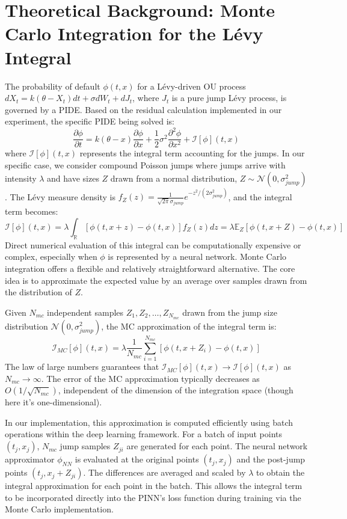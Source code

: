\documentclass[11pt,twoside,openright]{report}
\begin{document}
\section{Theoretical Background: Monte Carlo Integration for the Lévy Integral}
\label{sec:mc_background}

The probability of default $\phi(t, x)$ for a Lévy-driven OU process $dX_t = k(\theta - X_t)dt + \sigma dW_t + dJ_t$, where $J_t$ is a pure jump Lévy process, is governed by a PIDE. Based on the residual calculation implemented in our experiment, the specific PIDE being solved is:
$$
\frac{\partial \phi}{\partial t} = k(\theta - x)\frac{\partial \phi}{\partial x} + \frac{1}{2}\sigma^2 \frac{\partial^2 \phi}{\partial x^2} + \mathcal{I}[\phi](t, x)
$$
where $\mathcal{I}[\phi](t, x)$ represents the integral term accounting for the jumps. In our specific case, we consider compound Poisson jumps where jumps arrive with intensity $\lambda$ and have sizes $Z$ drawn from a normal distribution, $Z \sim \mathcal{N}(0, \sigma_{jump}^2)$. The Lévy measure density is $f_Z(z) = \frac{1}{\sqrt{2\pi}\sigma_{jump}} e^{-z^2/(2\sigma_{jump}^2)}$, and the integral term becomes:
$$
\mathcal{I}[\phi](t, x) = \lambda \int_{\mathbb{R}} [\phi(t, x+z) - \phi(t, x)] f_Z(z) dz = \lambda \mathbb{E}_Z[\phi(t, x+Z) - \phi(t, x)]
$$
Direct numerical evaluation of this integral can be computationally expensive or complex, especially when $\phi$ is represented by a neural network. Monte Carlo integration offers a flexible and relatively straightforward alternative. The core idea is to approximate the expected value by an average over samples drawn from the distribution of $Z$.

Given $N_{mc}$ independent samples $Z_1, Z_2, \dots, Z_{N_{mc}}$ drawn from the jump size distribution $\mathcal{N}(0, \sigma_{jump}^2)$, the MC approximation of the integral term is:
$$
\mathcal{I}_{MC}[\phi](t, x) = \lambda \frac{1}{N_{mc}} \sum_{i=1}^{N_{mc}} [\phi(t, x+Z_i) - \phi(t, x)]
$$
The law of large numbers guarantees that $\mathcal{I}_{MC}[\phi](t, x) \to \mathcal{I}[\phi](t, x)$ as $N_{mc} \to \infty$. The error of the MC approximation typically decreases as $O(1/\sqrt{N_{mc}})$, independent of the dimension of the integration space (though here it's one-dimensional).

In our implementation, this approximation is computed efficiently using batch operations within the deep learning framework. For a batch of input points $(t_j, x_j)$, $N_{mc}$ jump samples $Z_{ji}$ are generated for each point. The neural network approximator $\phi_{NN}$ is evaluated at the original points $(t_j, x_j)$ and the post-jump points $(t_j, x_j + Z_{ji})$. The differences are averaged and scaled by $\lambda$ to obtain the integral approximation for each point in the batch. This allows the integral term to be incorporated directly into the PINN's loss function during training via the Monte Carlo implementation.
\end{document}
